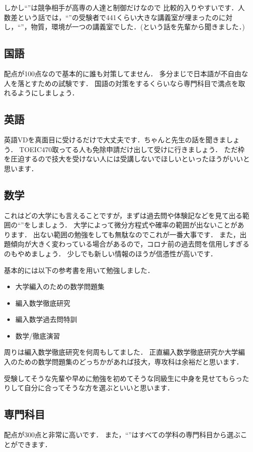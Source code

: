 \documentclass[dvipdfmx]{jsarticle}
\begin{document}
しかし``''は競争相手が高専の人達と制御だけなので
比較的入りやすいです．人数差という話では，``''の受験者で441くらい大きな講義室が埋まったのに対し，``''，物質，環境が一つの講義室でした．(という話を先輩から聞きました．)

\subsection{国語}
配点が100点なので基本的に誰も対策してません．
多分まじで日本語が不自由な人を落とすための試験です．
国語の対策をするくらいなら専門科目で満点を取れるようにしましょう．

\subsection{英語}
英語VDを真面目に受けるだけで大丈夫です．ちゃんと先生の話を聞きましょう．
TOEIC470取ってる人も免除申請だけ出して受けに行きましょう．
ただ枠を圧迫するので技大を受けない人には受講しないでほしいといったほうがいいと思います．

\subsection{数学}
これはどの大学にも言えることですが，まずは過去問や体験記などを見て出る範囲の``''をしましょう．
大学によって微分方程式や確率の範囲が出ないことがあります．
出ない範囲の勉強をしても無駄なのでこれが一番大事です．
また，出題傾向が大きく変わっている場合があるので，コロナ前の過去問を信用しすぎるのもやめましょう．
少しでも新しい情報のほうが信憑性が高いです．

基本的には以下の参考書を用いて勉強しました．
\begin{itemize}
  \item 大学編入のための数学問題集
  \item 編入数学徹底研究
  \item 編入数学過去問特訓
  \item 数学/徹底演習
\end{itemize}
周りは編入数学徹底研究を何周もしてました．
正直編入数学徹底研究か大学編入のための数学問題集のどっちかがあれば技大，専攻科は余裕だと思います．

受験してそうな先輩や早めに勉強を初めてそうな同級生に中身を見せてもらったりして自分に合ってそうな方を選ぶといいと思います．

\subsection{専門科目}
配点が300点と非常に高いです．
また，``''はすべての学科の専門科目から選ぶことができます．
\end{document}
